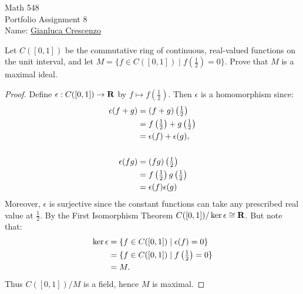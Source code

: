 \documentclass[10pt,twoside,openany]{memoir}
\begin{document}
\begin{center}
    {\Large Math 548 \\[0.1in]Portfolio Assignment 8}\\[.175in]
    {Name:} {\underline{Gianluca Crescenzo\hspace*{2in}}}\\[0.15in]
    \end{center}
    \vspace{4pt}
\begin{problem}[S23, P4]
    Let $C([0,1])$ be the commutative ring of continuous, real-valued functions on the unit interval, and let $M = \{f \in C([0,1]) \mid f\left(\frac{1}{2}\right) = 0\}$. Prove that $M$ is a maximal ideal.
\end{problem}
    {\color{blue} \begin{proof}
        Define $\epsilon:C([0,1]) \rightarrow \mathbf{R}$ by $f \mapsto f\left(\frac{1}{2}\right)$. Then $\epsilon$ is a homomorphism since:
            \begin{equation*}
            \begin{split}
                \epsilon(f+g)
                & = (f+g)\left( \textstyle\frac{1}{2} \right) \\
                & = f\left( \textstyle\frac{1}{2} \right) + g\left( \textstyle\frac{1}{2} \right) \\
                & = \epsilon(f) + \epsilon(g), \\
                & \phantom{a} \\
                \epsilon(fg) & = (fg)\left( \textstyle\frac{1}{2} \right) \\
                & = f\left( \textstyle\frac{1}{2} \right)g\left( \textstyle\frac{1}{2} \right) \\
                & = \epsilon(f)\epsilon(g)
            \end{split}
            \end{equation*}
        Moreover, $\epsilon$ is surjective since the constant functions can take any prescribed real value at $\frac{1}{2}$. By the First Isomorphism Theorem $C([0,1])/\ker{\epsilon} \cong \mathbf{R}$. But note that:
            \begin{equation*}
            \begin{split}
                \ker \epsilon 
                & = \{f \in C([0,1]) \mid \epsilon(f) = 0\} \\
                & = \{f \in C([0,1]) \mid f\left(\textstyle\frac{1}{2}\right) = 0\} \\
                & = M.
            \end{split}
            \end{equation*}
        Thus $C([0,1])/M$ is a field, hence $M$ is maximal.
    \end{proof}}
\end{document}
